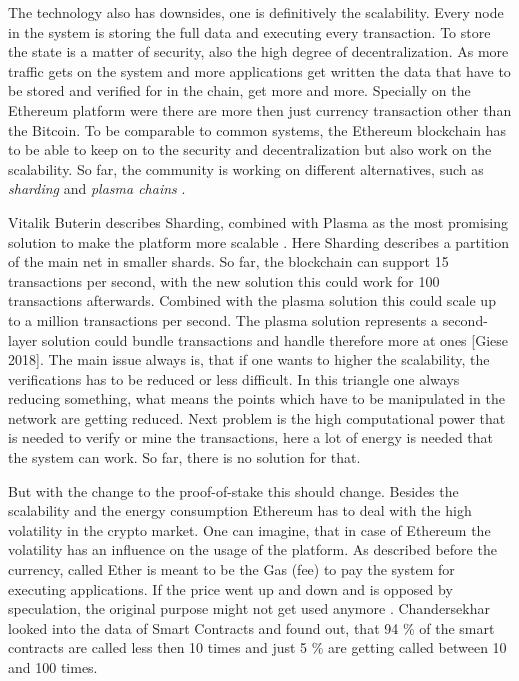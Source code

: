 The technology also has downsides, one is definitively the scalability. 
Every node in the system is storing the full data and executing every transaction. 
To store the state is a matter of security, also the high degree of decentralization. 
As more traffic gets on the system and more applications get written the data that have to be stored and verified for in the chain, get more and more. 
Specially on the Ethereum platform were there are more then just currency transaction other than the Bitcoin. 
To be comparable to common systems, the Ethereum blockchain has to be able to keep on to the security and decentralization but also work on the scalability. 
So far, the community is working on different alternatives, such as \emph{sharding} and \emph{plasma chains} \cite{Gadaleta2018}.

Vitalik Buterin describes Sharding, combined with Plasma as the most promising solution to make the platform more scalable \cite{Giese2018}.
Here Sharding describes a partition of the main net in smaller shards. 
So far, the blockchain can support 15 transactions per second, with the new solution this could work for 100 transactions afterwards. 
Combined with the plasma solution this could scale up to a million transactions per second. 
The plasma solution represents a second-layer solution could bundle transactions and handle therefore more at ones [Giese 2018].
The main issue always is, that if one wants to higher the scalability, the verifications has to be reduced or less difficult. 
In this triangle one always reducing something, what means the points which have to be manipulated in the network are getting reduced.
Next problem is the high computational power that is needed to verify or mine the transactions, here a lot of energy is needed that the system can work. So far, there is no solution for that.

But with the change to the proof-of-stake this should change.
Besides the scalability and the energy consumption Ethereum has to deal with the high volatility in the crypto market. 
One can imagine, that in case of Ethereum the volatility has an influence on the usage of the platform. 
As described before the currency, called Ether is meant to be the Gas (fee) to pay the system for executing applications. 
If the price went up and down and is opposed by speculation, the original purpose might not get used anymore \cite{Chandersekhar2018}. 
Chandersekhar looked into the data of Smart Contracts and found out, that 94 \% of the smart contracts are called less then 10 times and just 5 \% are getting called between 10 and 100 times. 
